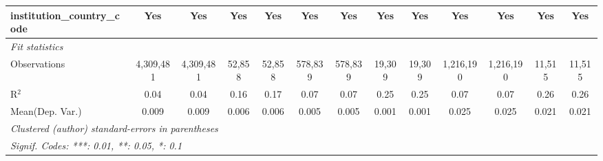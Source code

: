 \begin{tabular}{lcccccccccccc}
   institution\_country\_code               & Yes            & Yes              & Yes            & Yes             & Yes            & Yes              & Yes            & Yes            & Yes           & Yes             & Yes            & Yes\\  
   \midrule
   \emph{Fit statistics}\\
   Observations                             & 4,309,481      & 4,309,481        & 52,858         & 52,858          & 578,839        & 578,839          & 19,309         & 19,309         & 1,216,190     & 1,216,190       & 11,515         & 11,515\\  
   R$^2$                                    & 0.04           & 0.04             & 0.16           & 0.17            & 0.07           & 0.07             & 0.25           & 0.25           & 0.07          & 0.07            & 0.26           & 0.26\\  
Mean(Dep. Var.) & 0.009 & 0.009 & 0.006 & 0.006 & 0.005 & 0.005 & 0.001 & 0.001 & 0.025 & 0.025 & 0.021 & 0.021 \\
   \midrule \midrule
   \multicolumn{13}{l}{\emph{Clustered (author) standard-errors in parentheses}}\\
   \multicolumn{13}{l}{\emph{Signif. Codes: ***: 0.01, **: 0.05, *: 0.1}}\\
\end{tabular}
\par\endgroup
